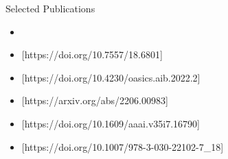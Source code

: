 %

\begin{rSection}{Selected Publications}
    \begin{itemize}[nosep]
        \item {}
        \item {}[https://doi.org/10.7557/18.6801]
        \item {}[https://doi.org/10.4230/oasics.aib.2022.2]
        \item {}[https://arxiv.org/abs/2206.00983]
        \item {}[https://doi.org/10.1609/aaai.v35i7.16790]
        \item {}[https://doi.org/10.1007/978-3-030-22102-7_18]
    \end{itemize} 
\end{rSection}
